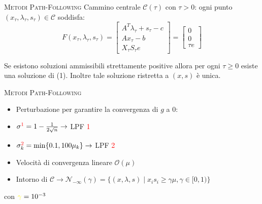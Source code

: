 \begin{frame}[t]{\textsc{\LARGE \textcolor{burntumber}{Metodi Path-Following}}}
	Cammino centrale $\mathcal{C}(\tau)$ con $\tau  > 0$: ogni punto $(x_{\tau}, \lambda_{\tau}, s_{\tau})\in \mathcal{C}$ soddisfa:
\begin{equation}\label{Ftao}\tag{1}
\mathit{F}(x_{\tau},\lambda_{\tau},s_{\tau})= \begin{bmatrix}
A^{T}\lambda_{\tau}+s_{\tau}-c \\Ax_{\tau}-b \\X_{\tau}S_{\tau}e
\end{bmatrix}=\begin{bmatrix}0\\0\\ \tau e \end{bmatrix}
\end{equation}

\begin{theorem}
	Se esistono soluzioni ammissibili strettamente positive allora per ogni $\tau\geq0$ esiste una soluzione di (1). Inoltre tale
	soluzione ristretta a $(x, s)$ è unica.
\end{theorem}
\end{frame}


\begin{frame}{\textsc{\LARGE \textcolor{burntumber}{Metodi Path-Following}}}

\begin{itemize}
	\item Perturbazione per garantire la convergenza di $g$ a $0$:
\end{itemize}
\pause
{}
\pause
\begin{itemize}
	\item[] \;\;\;\;\;\;\;\;\;\;\;\;\;\;\;\;\;\;\;\;\;\;\;\;\;$\sigma^{\textcolor{red}{1}} = 1 -\frac{1}{2\sqrt{n}}\rightarrow$\textrm{ LPF \textcolor{red}{1}}\pause
	\item[] \;\;\;\;\;\;\;\;\;\;\;\;\;\;\;\;\;\;\;\;\;\;\;\;\;$\sigma^{\textcolor{red}{2}}_{k} = \min\{0.1, 100\mu_{k}\}\rightarrow$\textrm{ LPF \textcolor{red}{2}}\pause	
\end{itemize}
\begin{itemize}
\item Velocità di convergenza lineare $\mathcal{O}(\mu)$
\pause
\item Intorno di $\mathcal{C}\rightarrow \mathcal{N}_{-\infty}(\gamma) =\{ (x, \lambda,s)\;|\; x_{i}s_{i} \geq \gamma \mu, \gamma \in [0,1)\}$
\end{itemize}
\;\;\;\;\;\;\;\;\;\;\;\;\;\;\;\;\;\;\;\;\;\;\;\;\;\;\;\;con $ \textcolor{yellow}{\mathbf{\gamma}}=10^{-3}$
\end{frame}

